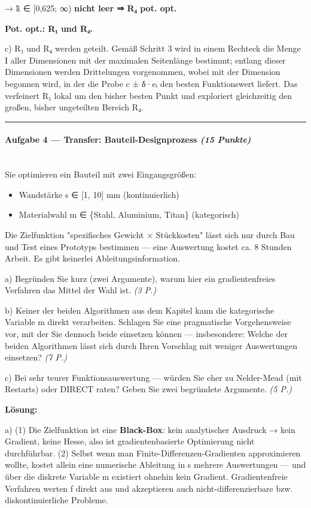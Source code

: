 \documentclass[11pt, a4paper]{article}
\begin{document}
→ k̃ ∈ [0,625; ∞) \textbf{nicht leer ⇒ R₄ pot. opt.}


\textbf{Pot. opt.: R₁ und R₄.}


c) R₁ und R₄ werden geteilt. Gemäß Schritt 3 wird in einem Rechteck die Menge I aller Dimensionen mit der maximalen Seitenlänge bestimmt; entlang dieser Dimensionen werden Drittelungen vorgenommen, wobei mit der Dimension begonnen wird, in der die Probe c⃗ ± δ·e⃗ᵢ den besten Funktionswert liefert. Das verfeinert R₁ lokal um den bisher besten Punkt und exploriert gleichzeitig den großen, bisher ungeteilten Bereich R₄.



\noindent\textcolor{rulegray}{\rule{\linewidth}{0.4pt}}


\paragraph{Aufgabe 4 — Transfer: Bauteil-Designprozess \textit{(15 Punkte)}}\mbox{}\\[2pt]

Sie optimieren ein Bauteil mit zwei Eingangsgrößen:

\begin{itemize}
  \item Wandstärke s ∈ [1, 10] mm (kontinuierlich)
  \item Materialwahl m ∈ \{Stahl, Aluminium, Titan\} (kategorisch)
\end{itemize}

Die Zielfunktion "spezifisches Gewicht × Stückkosten" lässt sich nur durch Bau und Test eines Prototyps bestimmen — eine Auswertung kostet ca. 8 Stunden Arbeit. Es gibt keinerlei Ableitungsinformation.


a) Begründen Sie kurz (zwei Argumente), warum hier ein gradientenfreies Verfahren das Mittel der Wahl ist. \textit{(3 P.)}


b) Keiner der beiden Algorithmen aus dem Kapitel kann die kategorische Variable m direkt verarbeiten. Schlagen Sie eine pragmatische Vorgehensweise vor, mit der Sie dennoch beide einsetzen können — insbesondere: Welche der beiden Algorithmen lässt sich durch Ihren Vorschlag mit weniger Auswertungen einsetzen? \textit{(7 P.)}


c) Bei sehr teurer Funktionsauswertung — würden Sie eher zu Nelder-Mead (mit Restarts) oder DIRECT raten? Geben Sie zwei begründete Argumente. \textit{(5 P.)}


\textbf{Lösung:}


a) (1) Die Zielfunktion ist eine \textbf{Black-Box}: kein analytischer Ausdruck → kein Gradient, keine Hesse, also ist gradientenbasierte Optimierung nicht durchführbar. (2) Selbst wenn man Finite-Differenzen-Gradienten approximieren wollte, kostet allein eine numerische Ableitung in s mehrere Auswertungen — und über die diskrete Variable m existiert ohnehin kein Gradient. Gradientenfreie Verfahren werten f direkt aus und akzeptieren auch nicht-differenzierbare bzw. diskontinuierliche Probleme.
\end{document}
